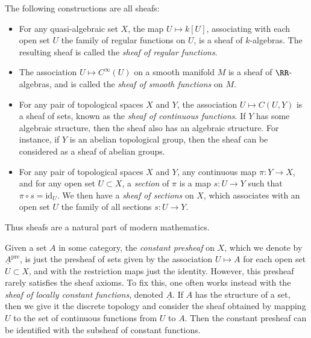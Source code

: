 \begin{example}
    The following constructions are all sheafs:
    \begin{itemize}
        \item For any quasi-algebraic set $X$, the map $U \mapsto k[U]$, associating with each open set $U$ the family of regular functions on $U$, is a sheaf of $k$-algebras. The resulting sheaf is called the \emph{sheaf of regular functions}.
        \item The association $U \mapsto C^\infty(U)$ on a smooth manifold $M$ is a sheaf of $\RR$-algebras, and is called the \emph{sheaf of smooth functions} on $M$.
        \item For any pair of topological spaces $X$ and $Y$, the association $U \mapsto C(U,Y)$ is a sheaf of sets, known as the \emph{sheaf of continuous functions}. If $Y$ has some algebraic structure, then the sheaf also has an algebraic structure. For instance, if $Y$ is an abelian topological group, then the sheaf can be considered as a sheaf of abelian groups.
        \item For any pair of topological spaces $X$ and $Y$, any continuous map $\pi: Y \to X$, and for any open set $U \subset X$, a \emph{section} of $\pi$ is a map $s: U \to Y$ such that $\pi \circ s = \text{id}_U$. We then have a \emph{sheaf of sections} on $X$, which associates with an open set $U$ the family of all sections $s: U \to Y$.
    \end{itemize}
    Thus sheafs are a natural part of modern mathematics.
\end{example}

\begin{example}
    Given a set $A$ in some category, the \emph{constant presheaf} on $X$, which we denote by $\underline{A}^{\text{pre}}$, is just the presheaf of sets given by the association $U \mapsto A$ for each open set $U \subset X$, and with the restriction maps just the identity. However, this presheaf rarely satisfies the sheaf axioms. To fix this, one often works instead with the \emph{sheaf of locally constant functions}, denoted $\underline{A}$. If $A$ has the structure of a set, then we give it the discrete topology and consider the sheaf obtained by mapping $U$ to the set of continuous functions from $U$ to $A$. Then the constant presheaf can be identified with the subsheaf of constant functions.
\end{example}

